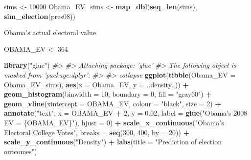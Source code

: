 \documentclass[]{book}
\newenvironment{Shaded}{\begin{snugshade}}{\end{snugshade}}
\newcommand{\KeywordTok}[1]{\textcolor[rgb]{0.13,0.29,0.53}{\textbf{#1}}}
\newcommand{\DataTypeTok}[1]{\textcolor[rgb]{0.13,0.29,0.53}{#1}}
\newcommand{\DecValTok}[1]{\textcolor[rgb]{0.00,0.00,0.81}{#1}}
\newcommand{\FloatTok}[1]{\textcolor[rgb]{0.00,0.00,0.81}{#1}}
\newcommand{\StringTok}[1]{\textcolor[rgb]{0.31,0.60,0.02}{#1}}
\newcommand{\CommentTok}[1]{\textcolor[rgb]{0.56,0.35,0.01}{\textit{#1}}}
\newcommand{\OperatorTok}[1]{\textcolor[rgb]{0.81,0.36,0.00}{\textbf{#1}}}
\newcommand{\NormalTok}[1]{#1}
\theoremstyle{definition}
\theoremstyle{definition}
\theoremstyle{definition}
\theoremstyle{remark}
\begin{document}
\begin{Shaded}
\begin{Highlighting}[]
\NormalTok{sims <-}\StringTok{ }\DecValTok{10000}
\NormalTok{Obama_EV_sims <-}\StringTok{ }\KeywordTok{map_dbl}\NormalTok{(}\KeywordTok{seq_len}\NormalTok{(sims), }\OperatorTok{~}\StringTok{ }\KeywordTok{sim_election}\NormalTok{(pres08))}
\end{Highlighting}
\end{Shaded}

Obama's actual electoral value

\begin{Shaded}
\begin{Highlighting}[]
\NormalTok{OBAMA_EV <-}\StringTok{ }\DecValTok{364}
\end{Highlighting}
\end{Shaded}

\begin{Shaded}
\begin{Highlighting}[]
\KeywordTok{library}\NormalTok{(}\StringTok{"glue"}\NormalTok{)}
\CommentTok{#> }
\CommentTok{#> Attaching package: 'glue'}
\CommentTok{#> The following object is masked from 'package:dplyr':}
\CommentTok{#> }
\CommentTok{#>     collapse}
\KeywordTok{ggplot}\NormalTok{(}\KeywordTok{tibble}\NormalTok{(}\DataTypeTok{Obama_EV =}\NormalTok{ Obama_EV_sims),}
       \KeywordTok{aes}\NormalTok{(}\DataTypeTok{x =}\NormalTok{ Obama_EV, }\DataTypeTok{y =}\NormalTok{ ..density..)) }\OperatorTok{+}
\StringTok{  }\KeywordTok{geom_histogram}\NormalTok{(}\DataTypeTok{binwidth =} \DecValTok{10}\NormalTok{, }\DataTypeTok{boundary =} \DecValTok{0}\NormalTok{, }\DataTypeTok{fill =} \StringTok{"gray60"}\NormalTok{) }\OperatorTok{+}
\StringTok{  }\KeywordTok{geom_vline}\NormalTok{(}\DataTypeTok{xintercept =}\NormalTok{ OBAMA_EV, }\DataTypeTok{colour =} \StringTok{"black"}\NormalTok{, }\DataTypeTok{size =} \DecValTok{2}\NormalTok{) }\OperatorTok{+}
\StringTok{  }\KeywordTok{annotate}\NormalTok{(}\StringTok{"text"}\NormalTok{, }\DataTypeTok{x =}\NormalTok{ OBAMA_EV }\OperatorTok{+}\StringTok{ }\DecValTok{2}\NormalTok{, }\DataTypeTok{y =} \FloatTok{0.02}\NormalTok{,}
           \DataTypeTok{label =} \KeywordTok{glue}\NormalTok{(}\StringTok{"Obama's 2008 EV = \{OBAMA_EV\}"}\NormalTok{), }\DataTypeTok{hjust =} \DecValTok{0}\NormalTok{) }\OperatorTok{+}
\StringTok{  }\KeywordTok{scale_x_continuous}\NormalTok{(}\StringTok{"Obama's Electoral College Votes"}\NormalTok{,}
                     \DataTypeTok{breaks =} \KeywordTok{seq}\NormalTok{(}\DecValTok{300}\NormalTok{, }\DecValTok{400}\NormalTok{, }\DataTypeTok{by =} \DecValTok{20}\NormalTok{)) }\OperatorTok{+}
\StringTok{  }\KeywordTok{scale_y_continuous}\NormalTok{(}\StringTok{"Density"}\NormalTok{) }\OperatorTok{+}
\StringTok{  }\KeywordTok{labs}\NormalTok{(}\DataTypeTok{title =} \StringTok{"Prediction of election outcomes"}\NormalTok{)}
\end{Highlighting}
\end{Shaded}
\end{document}
